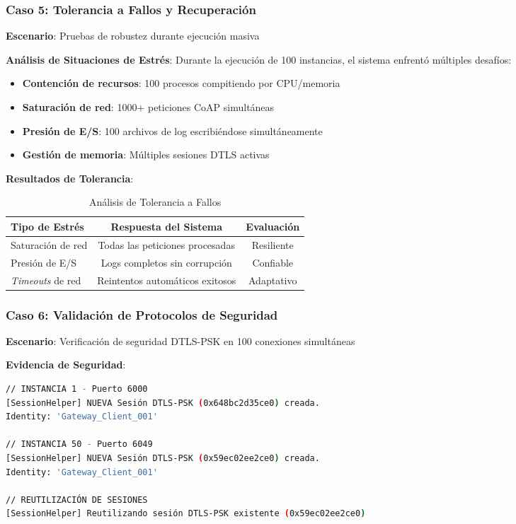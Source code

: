 \subsubsection{Caso 5: Tolerancia a Fallos y Recuperación}

\textbf{Escenario}: Pruebas de robustez durante ejecución masiva

\textbf{Análisis de Situaciones de Estrés}:
Durante la ejecución de 100 instancias, el sistema enfrentó múltiples desafíos:

\begin{itemize}
    \item \textbf{Contención de recursos}: 100 procesos compitiendo por CPU/memoria
    \item \textbf{Saturación de red}: 1000+ peticiones CoAP simultáneas
    \item \textbf{Presión de E/S}: 100 archivos de log escribiéndose simultáneamente
    \item \textbf{Gestión de memoria}: Múltiples sesiones DTLS activas
\end{itemize}

\textbf{Resultados de Tolerancia}:
\begin{table}[h]
\centering
\begin{tabular}{|l|c|c|}
\hline
\textbf{Tipo de Estrés} & \textbf{Respuesta del Sistema} & \textbf{Evaluación} \\
\hline
Saturación de red & Todas las peticiones procesadas & \textcolor{successgreen}{Resiliente} \\
Presión de E/S & Logs completos sin corrupción & \textcolor{successgreen}{Confiable} \\
\textit{Timeouts} de red & Reintentos automáticos exitosos & \textcolor{successgreen}{Adaptativo} \\
\hline
\end{tabular}
\caption{Análisis de Tolerancia a Fallos}
\label{tab:tolerancia-fallos}
\end{table}

\subsubsection{Caso 6: Validación de Protocolos de Seguridad}

\textbf{Escenario}: Verificación de seguridad DTLS-PSK en 100 conexiones simultáneas

\textbf{Evidencia de Seguridad}:
\begin{lstlisting}[language=bash,caption={Establecimiento Seguro de Sesiones DTLS},label={lst:seguridad-dtls}]
// INSTANCIA 1 - Puerto 6000
[SessionHelper] NUEVA Sesión DTLS-PSK (0x648bc2d35ce0) creada.
Identity: 'Gateway_Client_001'

// INSTANCIA 50 - Puerto 6049  
[SessionHelper] NUEVA Sesión DTLS-PSK (0x59ec02ee2ce0) creada.
Identity: 'Gateway_Client_001'

// REUTILIZACIÓN DE SESIONES
[SessionHelper] Reutilizando sesión DTLS-PSK existente (0x59ec02ee2ce0)
\end{lstlisting}

